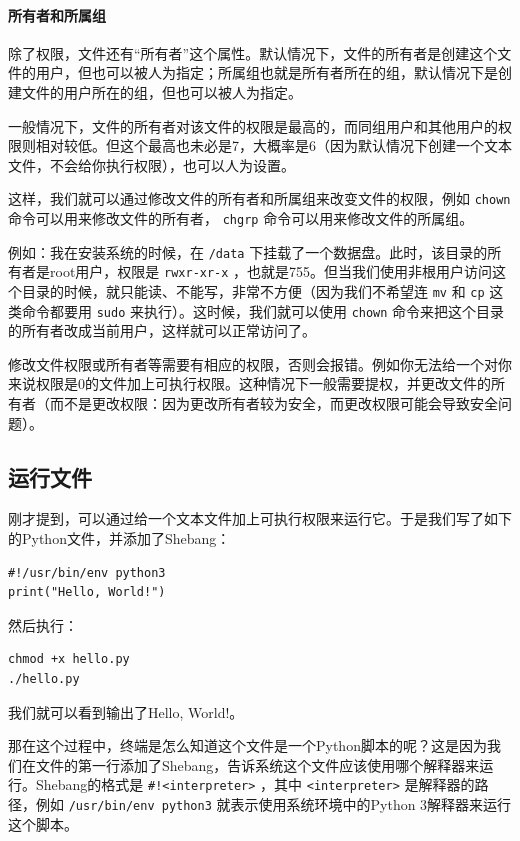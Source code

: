 \paragraph{所有者和所属组}

除了权限，文件还有“所有者”这个属性。默认情况下，文件的所有者是创建这个文件的用户，但也可以被人为指定；所属组也就是所有者所在的组，默认情况下是创建文件的用户所在的组，但也可以被人为指定。

一般情况下，文件的所有者对该文件的权限是最高的，而同组用户和其他用户的权限则相对较低。但这个最高也未必是7，大概率是6（因为默认情况下创建一个文本文件，不会给你执行权限），也可以人为设置。

这样，我们就可以通过修改文件的所有者和所属组来改变文件的权限，例如 \texttt{chown} 命令可以用来修改文件的所有者， \texttt{chgrp} 命令可以用来修改文件的所属组。

例如：我在安装系统的时候，在 \texttt{/data} 下挂载了一个数据盘。此时，该目录的所有者是root用户，权限是 \texttt{rwxr-xr-x} ，也就是755。但当我们使用非根用户访问这个目录的时候，就只能读、不能写，非常不方便（因为我们不希望连 \texttt{mv} 和 \texttt{cp} 这类命令都要用 \texttt{sudo} 来执行）。这时候，我们就可以使用 \texttt{chown} 命令来把这个目录的所有者改成当前用户，这样就可以正常访问了。

\begin{tip}
  修改文件权限或所有者等需要有相应的权限，否则会报错。例如你无法给一个对你来说权限是0的文件加上可执行权限。这种情况下一般需要提权，并更改文件的所有者（而不是更改权限：因为更改所有者较为安全，而更改权限可能会导致安全问题）。
\end{tip}

\subsection{运行文件}

刚才提到，可以通过给一个文本文件加上可执行权限来运行它。于是我们写了如下的Python文件，并添加了Shebang：
\begin{verbatim}
#!/usr/bin/env python3
print("Hello, World!")
\end{verbatim}
然后执行：
\begin{verbatim}
chmod +x hello.py
./hello.py
\end{verbatim}
我们就可以看到输出了Hello, World!。

那在这个过程中，终端是怎么知道这个文件是一个Python脚本的呢？这是因为我们在文件的第一行添加了Shebang，告诉系统这个文件应该使用哪个解释器来运行。Shebang的格式是 \texttt{\#!<interpreter>} ，其中 \texttt{<interpreter>} 是解释器的路径，例如 \texttt{/usr/bin/env python3} 就表示使用系统环境中的Python 3解释器来运行这个脚本。

